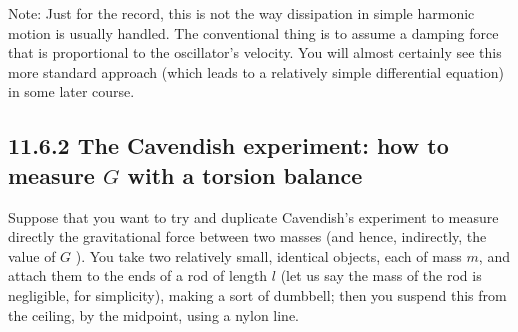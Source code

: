 \documentclass[10pt]{article}
\begin{document}
Note: Just for the record, this is not the way dissipation in simple harmonic motion is usually handled. The conventional thing is to assume a damping force that is proportional to the oscillator's velocity. You will almost certainly see this more standard approach (which leads to a relatively simple differential equation) in some later course.

\subsection*{11.6.2 The Cavendish experiment: how to measure $G$ with a torsion balance}
Suppose that you want to try and duplicate Cavendish's experiment to measure directly the gravitational force between two masses (and hence, indirectly, the value of $G$ ). You take two relatively small, identical objects, each of mass $m$, and attach them to the ends of a rod of length $l$ (let us say the mass of the rod is negligible, for simplicity), making a sort of dumbbell; then you suspend this from the ceiling, by the midpoint, using a nylon line.
\end{document}
